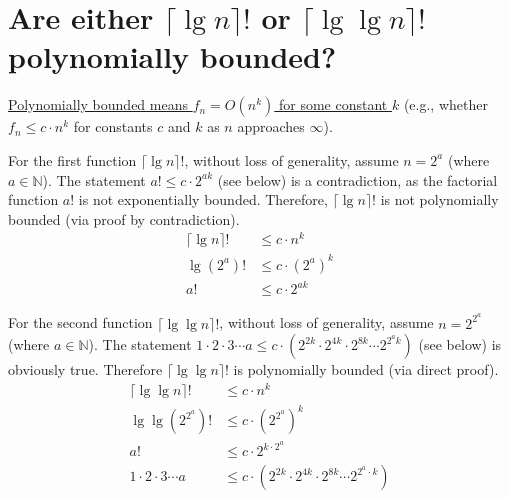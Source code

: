 \section[Problem 1]{Are either $\lceil \lg n \rceil!$ or $\lceil \lg \lg n \rceil!$ polynomially bounded?}

\ul{Polynomially bounded means $f_n = O(n^k)$ for some constant $k$} (e.g., whether $f_n \leq c \cdot n^k$ for constants $c$ and $k$ as $n$ approaches $\infty$). 

For the first function $\lceil \lg n \rceil!$, without loss of generality, assume $n = 2^a$ (where $a \in \mathbb{N}$). 
The statement $a! \leq c \cdot 2^{ak}$ (see below) is a contradiction, as the factorial function $a!$ is not exponentially bounded. Therefore, $\lceil \lg n \rceil!$ is not polynomially bounded (via proof by contradiction).
\begin{align*}
	\lceil \lg n \rceil ! & \leq c \cdot n^k \\
	\lg (2^a) ! & \leq c \cdot (2^a)^k \\
	a! & \leq c \cdot 2^{ak}
\end{align*}


For the second function $\lceil \lg \lg n \rceil!$, without loss of generality, assume $n = 2^{2^a}$ (where $a \in \mathbb{N}$).
The statement $1 \cdot 2 \cdot 3 \cdots a \leq c \cdot \left( 2^{2k} \cdot 2^{4k} \cdot 2^{8k} \cdots 2^{2^a k} \right)$ (see below) is obviously true. Therefore $\lceil \lg \lg n \rceil!$ is polynomially bounded (via direct proof).
\begin{align*}
	 \lceil \lg \lg n \rceil! & \leq c \cdot n^k \\
	 \lg \lg \left( 2^{2^a} \right) ! & \leq c \cdot \left( 2^{2^a} \right)^k \\
	 a! & \leq c \cdot 2^{k \cdot {2^a}} \\
	 1 \cdot 2 \cdot 3 \cdots a & \leq c \cdot \left( 2^{2k} \cdot 2^{4k} \cdot 2^{8k} \cdots 2^{2^a \cdot k} \right)
\end{align*}


